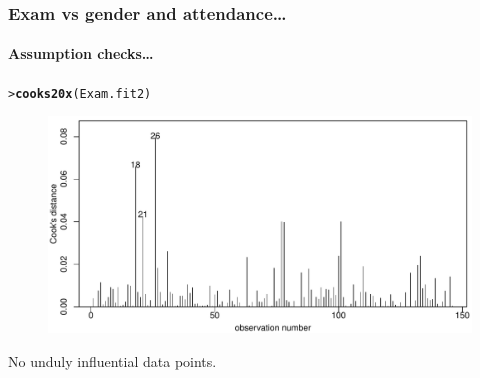 \documentclass{beamer}\usepackage[]{graphicx}\usepackage[]{xcolor}
\makeatletter
\newcommand{\hlstd}[1]{\textcolor[rgb]{0.345,0.345,0.345}{#1}}%
\newcommand{\hlkwd}[1]{\textcolor[rgb]{0.737,0.353,0.396}{\textbf{#1}}}%
\newenvironment{kframe}{%
 \def\at@end@of@kframe{}%
 \ifinner\ifhmode%
  \def\at@end@of@kframe{\end{minipage}}%
  \begin{minipage}{\columnwidth}%
 \fi\fi%
 \def\FrameCommand##1{\hskip\@totalleftmargin \hskip-\fboxsep
 \colorbox{shadecolor}{##1}\hskip-\fboxsep
     \hskip-\linewidth \hskip-\@totalleftmargin \hskip\columnwidth}%
 \MakeFramed {\advance\hsize-\width
   \@totalleftmargin\z@ \linewidth\hsize
   \@setminipage}}%
 {\par\unskip\endMakeFramed%
 \at@end@of@kframe}
\newenvironment{knitrout}{}{} %
\makeatother
\begin{document}
\begin{frame}[fragile]
\frametitle{Exam vs gender and attendance\ldots}
\framesubtitle{Assumption checks\ldots}

\begin{knitrout}\scriptsize
{}\color{fgcolor}\begin{kframe}
\begin{alltt}
\hlstd{> }\hlkwd{cooks20x}\hlstd{(Exam.fit2)}
\end{alltt}
\end{kframe}
\end{knitrout}



\begin{figure}
  \centering
  \includegraphics[scale = 0.5]{figure/RC-H12-026}
\end{figure}

No unduly influential data points.
\end{frame}
\end{document}

